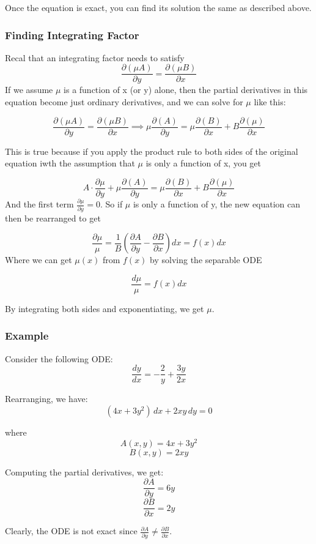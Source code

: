 \documentclass[12pt]{article}
\begin{document}
Once the equation is exact, you can find its solution the same as described above. \\
\subsubsection{Finding Integrating Factor}
Recal that an integrating factor needs to satisfy 
\[\frac{\partial (\mu A)}{\partial y} = \frac{\partial( \mu B)}{\partial x}\]
If we assume \(\mu\) is a function of x (or y) alone, then the partial derivatives in this equation become just ordinary derivatives, and we can solve for \(\mu\) like this:

\[\frac{\partial (\mu A)}{\partial y} = \frac{\partial( \mu B)}{\partial x} \implies \mu \frac{\partial (A)}{\partial y} = \mu  \frac{\partial(B)}{\partial x} + B \frac{\partial( \mu)}{\partial x}\]

This is true because if you apply the product rule to both sides of the original equation iwth the assumption that \(\mu\) is only a function of x, you get

\[A \cdot \frac{\partial \mu}{\partial y} + \mu \frac{\partial (A)}{\partial y} = \mu  \frac{\partial(B)}{\partial x} + B \frac{\partial( \mu)}{\partial x}\]
And the first term \(\frac{\partial \mu}{\partial y} = 0\). So if \(\mu\) is only a function of y, the new equation can then be rearranged to get

\[\frac{\partial \mu}{\mu} = \frac{1}{B}\left( \frac{\partial A}{\partial y} - \frac{\partial B}{\partial x}\right)dx = f(x)dx\]
Where we can get \(\mu(x)\) from \(f(x)\) by solving the separable ODE 

 \[\frac{d \mu}{\mu} = f(x)dx\]

By integrating both sides and exponentiating, we get \(\mu\).
\subsubsection{Example}
Consider the following ODE:
\[ \frac{dy}{dx} = -\frac{2}{y} + \frac{3y}{2x} \]

Rearranging, we have:
\[ (4x + 3y^2) \, dx + 2xy \, dy = 0 \]

where
\[ A(x, y) = 4x + 3y^2 \]
\[ B(x, y) = 2xy \]

Computing the partial derivatives, we get:
\[ \frac{\partial A}{\partial y} = 6y \]
\[ \frac{\partial B}{\partial x} = 2y \]

Clearly, the ODE is not exact since \( \frac{\partial A}{\partial y} \neq \frac{\partial B}{\partial x} \).
\end{document}
